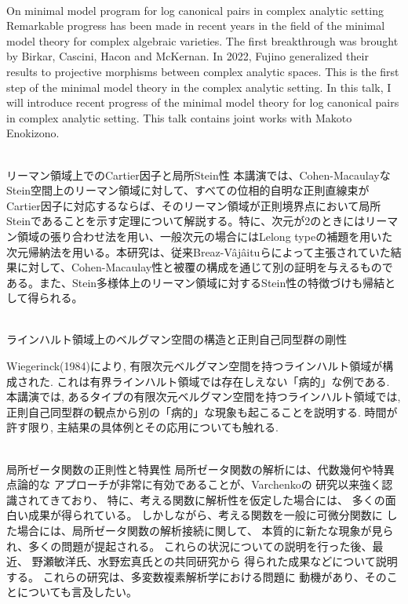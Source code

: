 \documentclass[dvipdfmx,a4paper,12pt]{article}
\theoremstyle{plain} %
\theoremstyle{definition} %
\begin{document}
\vskip5mm

\\
On minimal model program for log canonical pairs in complex analytic setting 
\vskip3mm
Remarkable progress has been made in recent years in the field of the minimal model theory for complex algebraic varieties. The first breakthrough was brought by Birkar, Cascini, Hacon and McKernan. In 2022, Fujino generalized their results to projective morphisms between complex analytic spaces. This is the first step of the minimal model theory in the complex analytic setting. In this talk, I will introduce recent progress of the minimal model theory for log canonical pairs in complex analytic setting. This talk contains joint works with Makoto Enokizono.

\vskip8mm


\\
リーマン領域上でのCartier因子と局所Stein性
\vskip3mm
本講演では、Cohen-MacaulayなStein空間上のリーマン領域に対して、すべての位相的自明な正則直線束がCartier因子に対応するならば、そのリーマン領域が正則境界点において局所Steinであることを示す定理について解説する。特に、次元が2のときにはリーマン領域の張り合わせ法を用い、一般次元の場合にはLelong typeの補題を用いた次元帰納法を用いる。本研究は、従来Breaz-Vâjâituらによって主張されていた結果に対して、Cohen-Macaulay性と被覆の構成を通じて別の証明を与えるものである。また、Stein多様体上のリーマン領域に対するStein性の特徴づけも帰結として得られる。
\vskip8mm


\\
ラインハルト領域上のベルグマン空間の構造と正則自己同型群の剛性

\vskip3mm
Wiegerinck(1984)により, 有限次元ベルグマン空間を持つラインハルト領域が構成された. これは有界ラインハルト領域では存在しえない「病的」な例である. 本講演では, あるタイプの有限次元ベルグマン空間を持つラインハルト領域では, 正則自己同型群の観点から別の「病的」な現象も起こることを説明する. 時間が許す限り, 主結果の具体例とその応用についても触れる.
\vskip8mm

\newpage

\\
局所ゼータ関数の正則性と特異性
\vskip3mm
 局所ゼータ関数の解析には、代数幾何や特異点論的な
アプローチが非常に有効であることが、Varchenkoの
研究以来強く認識されてきており、
特に、考える関数に解析性を仮定した場合には、
多くの面白い成果が得られている。
しかしながら、考える関数を一般に可微分関数に
した場合には、局所ゼータ関数の解析接続に関して、
本質的に新たな現象が見られ、多くの問題が提起される。
これらの状況についての説明を行った後、最近、
野瀬敏洋氏、水野宏真氏との共同研究から
得られた成果などについて説明する。
これらの研究は、多変数複素解析学における問題に
動機があり、そのことについても言及したい。
\vskip10mm
\end{document}

